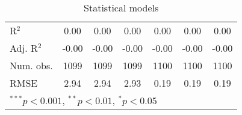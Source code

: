 \documentclass{article}
\begin{document}
\begin{table}
\begin{center}
\begin{tabular}{l c c c c c c }
\hline
R$^2$                         & 0.00         & 0.00         & 0.00         & 0.00         & 0.00         & 0.00         \\
Adj. R$^2$                    & -0.00        & -0.00        & -0.00        & -0.00        & -0.00        & -0.00        \\
Num. obs.                     & 1099         & 1099         & 1099         & 1100         & 1100         & 1100         \\
RMSE                          & 2.94         & 2.94         & 2.93         & 0.19         & 0.19         & 0.19         \\
\hline
\multicolumn{7}{l}{\scriptsize{$^{***}p<0.001$, $^{**}p<0.01$, $^*p<0.05$}}
\end{tabular}
\caption{Statistical models}
\label{table:coefficients}
\end{center}
\end{table}
\end{document}
